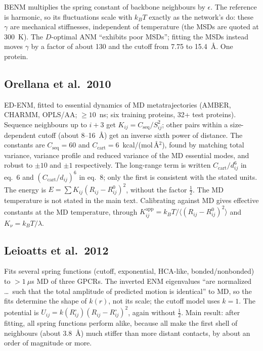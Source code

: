 \documentclass[11pt]{article}
\begin{document}
BENM multiplies the spring constant of backbone neighbours by $\epsilon$.
The reference is harmonic, so its fluctuations scale with $k_BT$ exactly as the network's
do: these $\gamma$ are mechanical stiffnesses, independent of temperature (the MSDs are
quoted at 300~K).
The $D$-optimal ANM ``exhibits poor MSDs''; fitting the MSDs instead moves $\gamma$ by a
factor of about 130 and the cutoff from 7.75 to 15.4~\AA.
One protein.

\subsection*{Orellana et al.\ 2010 \cite{orellana2010}}

ED-ENM, fitted to essential dynamics of MD metatrajectories (AMBER, CHARMM, OPLS/AA;
$\geq 10$~ns; six training proteins, 32+ test proteins).
Sequence neighbours up to $i+3$ get $K_{ij} = C_{\mathrm{seq}}/S_{ij}^{2}$; other pairs within
a size-dependent cutoff (about 8--16~\AA) get an inverse sixth power of distance.
The constants are $C_{\mathrm{seq}} = 60$ and $C_{\mathrm{cart}} = 6$~kcal/(mol\,\AA$^2$),
found by matching total variance, variance profile and reduced variance of the MD essential
modes, and robust to $\pm 10$ and $\pm 1$ respectively.
The long-range term is written $C_{\mathrm{cart}}/d_{ij}^{6}$ in eq.~6 and
$(C_{\mathrm{cart}}/d_{ij})^{6}$ in eq.~8; only the first is consistent with the stated
units.
The energy is $E = \sum K_{ij}(R_{ij}-R^0_{ij})^2$, without the factor $\tfrac12$.
The MD temperature is not stated in the main text.
Calibrating against MD gives effective constants at the MD temperature, through
$K^{\mathrm{app}}_{ij} = k_BT/\langle (R_{ij}-R^0_{ij})^2\rangle$ and $K_\nu = k_BT/\lambda$.

\subsection*{Leioatts et al.\ 2012 \cite{leioatts2012}}

Fits several spring functions (cutoff, exponential, HCA-like, bonded/nonbonded) to
$>1~\mu$s MD of three GPCRs.
The inverted ENM eigenvalues ``are normalized \ldots\ such that the total amplitude of
predicted motion is identical'' to MD, so the fits determine the shape of $k(r)$, not its
scale; the cutoff model uses $k = 1$.
The potential is $U_{ij} = k(R^\circ_{ij})(R_{ij}-R^\circ_{ij})^2$, again without
$\tfrac12$.
Main result: after fitting, all spring functions perform alike, because all make the first
shell of neighbours (about 3.8~\AA) much stiffer than more distant contacts, by about an
order of magnitude or more.
\end{document}
